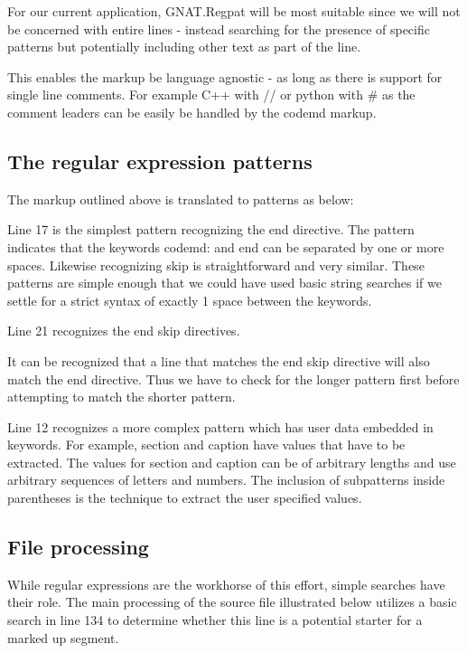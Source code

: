\documentclass[12pt, a4paper]{article}
\begin{document}
For our current application, GNAT.Regpat will be most suitable since we will not be 
concerned with entire lines - instead searching for the presence of specific patterns 
but potentially including other text as part of the line. 

This enables the markup be language agnostic - as long as there is support for 
single line comments. For example C++ with // or python with \# as the comment leaders can be easily be handled by the codemd markup.

\subsection{The regular expression patterns}

The markup outlined above is translated to patterns as below: 


Line 17 is the simplest pattern recognizing the end directive. The pattern indicates that the keywords codemd: and end can be separated by one or more spaces. Likewise recognizing skip is straightforward and very similar. These patterns are simple enough that we could have used basic string searches if we settle for a strict syntax of exactly 1 space between the keywords.

Line 21 recognizes the end skip directives.

It can be recognized that a line that matches the end skip directive will also match the end directive. Thus we have to check for the longer pattern first before attempting to match the shorter pattern.

Line 12 recognizes a more complex pattern which has user data embedded in keywords. For example, section and caption have values that have to be extracted. The values for section and caption can be of arbitrary lengths and use arbitrary sequences of letters and numbers. The inclusion of subpatterns inside parentheses is the technique to extract the user specified values.

\subsection{File processing}


While regular expressions are the workhorse of this effort, 
simple searches have their role. The main processing of the source file 
illustrated below utilizes a basic search in line 134 to determine whether 
this line is a potential starter for a marked up segment.
\end{document}
